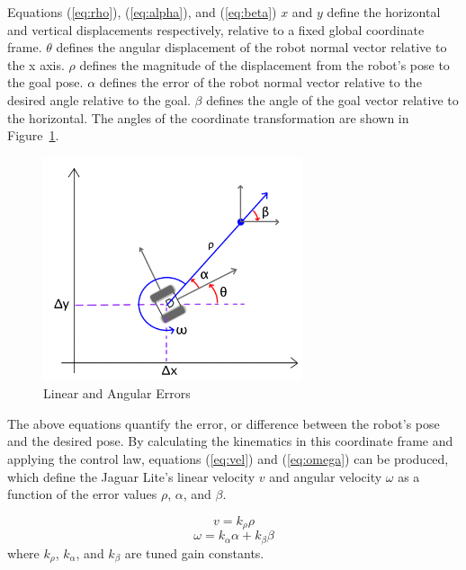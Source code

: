 \documentclass[conference]{IEEEtran}
\begin{document}
Equations (\ref{eq:rho}), (\ref{eq:alpha}), and (\ref{eq:beta}) $x$ and $y$ define the horizontal and vertical displacements
respectively, relative to a fixed global coordinate frame.  $\theta$ defines the 
angular displacement of the robot normal vector relative to the x axis.  
$\rho$ defines the magnitude of the displacement from the robot's pose to the 
goal pose.  $\alpha$ defines the error of the robot normal vector relative to 
the desired angle relative to the goal.  $\beta$ defines the angle of the goal vector 
relative to the horizontal.  The angles of the coordinate transformation are shown in Figure~\ref{fig3}. 

\begin{figure}
\centering
\includegraphics[width = 3in]{pic2.png}
\caption{Linear and Angular Errors}
\label{fig3}
\end{figure}

The above equations quantify the error, or difference between the robot's pose and
the desired pose.  By calculating the kinematics in this coordinate frame and applying the control law, equations (\ref{eq:vel}) and (\ref{eq:omega}) can be produced, which define the
Jaguar Lite's linear velocity $v$ and angular velocity $\omega$ as a 
function of the error values $\rho$, $\alpha$, and $\beta$.  

\begin{equation}\label{eq:vel}
v = k_{\rho} \rho
\end{equation}
\begin{equation}\label{eq:omega}
\omega = k_{\alpha} \alpha  +  k_{\beta} \beta 
\end{equation}
where $k_{\rho}$, $k_{\alpha}$, and $k_{\beta}$ are tuned gain constants.
\end{document}
